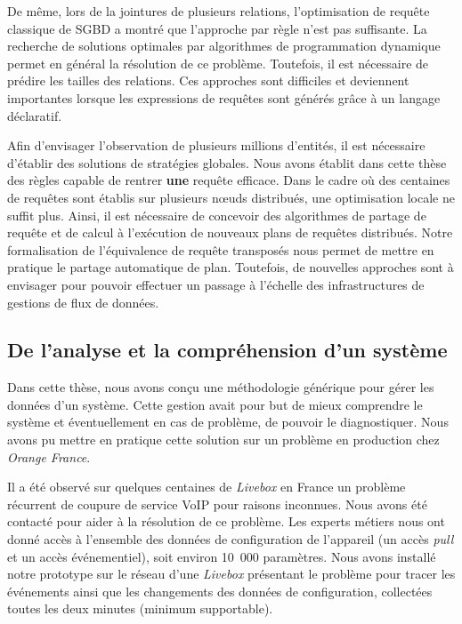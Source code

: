 De même, lors de la jointures de plusieurs relations, l'optimisation de requête classique de SGBD a montré que l'approche par règle n'est pas suffisante. La recherche de solutions optimales par algorithmes de programmation dynamique permet en général la résolution de ce problème. Toutefois, il est nécessaire de prédire les tailles des relations. Ces approches sont difficiles et deviennent importantes lorsque les expressions de requêtes sont générés grâce à un langage déclaratif.

Afin d'envisager l'observation de plusieurs millions d'entités, il est nécessaire d'établir des solutions de stratégies globales. Nous avons établit dans cette thèse des règles capable de rentrer \textbf{une} requête efficace. Dans le cadre où des centaines de requêtes sont établis sur plusieurs nœuds distribués, une optimisation locale ne suffit plus. Ainsi, il est nécessaire de concevoir des algorithmes de partage de requête et de calcul à l'exécution de nouveaux plans de requêtes distribués. Notre formalisation de l'équivalence de requête transposés nous permet de mettre en pratique le partage automatique de plan. Toutefois, de nouvelles approches sont à envisager pour pouvoir effectuer un passage à l'échelle des infrastructures de gestions de flux de données.

\subsection{De l'analyse et la compréhension d'un système}
Dans cette thèse, nous avons conçu une méthodologie générique pour gérer les données d'un système. Cette gestion avait pour but de mieux comprendre le système et éventuellement en cas de problème, de pouvoir le diagnostiquer. Nous avons pu mettre en pratique cette solution sur un problème en production chez \textit{Orange France}.

Il a été observé sur quelques centaines de \textit{Livebox} en France un problème récurrent de coupure de service VoIP pour raisons inconnues. Nous avons été contacté pour aider à la résolution de ce problème. Les experts métiers nous ont donné accès à l'ensemble des données de configuration de l'appareil (un accès \textit{pull} et un accès événementiel), soit environ 10~000 paramètres. Nous avons installé notre prototype sur le réseau d'une \textit{Livebox} présentant le problème pour tracer les événements ainsi que les changements des données de configuration, collectées toutes les deux minutes (minimum supportable).

